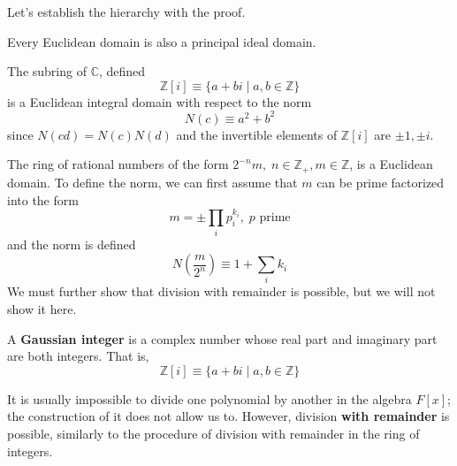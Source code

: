   Let's establish the hierarchy with the proof. 

  \begin{proposition}
    Every Euclidean domain is also a principal ideal domain. 
  \end{proposition}

  \begin{example}
    The subring of $\mathbb{C}$, defined
    \begin{equation}
      \mathbb{Z}[i] \equiv \{ a + b i \; | \; a, b \in \mathbb{Z} \}
    \end{equation}
    is a Euclidean integral domain with respect to the norm 
    \begin{equation}
      N(c) \equiv a^2 + b^2
    \end{equation}
    since $N(c d) = N(c) N(d)$ and the invertible elements of $\mathbb{Z}[i]$ are $\pm 1, \pm i$. 
  \end{example}

  \begin{example}
    The ring of rational numbers of the form $2^{-n} m, \; n \in \mathbb{Z}_+, m \in \mathbb{Z}$, is a Euclidean domain. To define the norm, we can first assume that $m$ can be prime factorized into the form 
    \begin{equation}
      m = \pm \prod_{i} p_{i}^{k_i}, \; p \text{ prime}
    \end{equation}
    and the norm is defined 
    \begin{equation}
      N(\frac{m}{2^n}) \equiv 1 + \sum_i k_i
    \end{equation}
    We must further show that division with remainder is possible, but we will not show it here. 
  \end{example}

  \begin{definition}
    A \textbf{Gaussian integer} is a complex number whose real part and imaginary part are both integers. That is, 
    \begin{equation}
      \mathbb{Z}[i] \equiv \{a + b i \;|\; a, b \in \mathbb{Z} \}
    \end{equation}
  \end{definition}

  It is usually impossible to divide one polynomial by another in the algebra $F[x]$; the construction of it does not allow us to. However, division \textbf{with remainder} is possible, similarly to the procedure of division with remainder in the ring of integers. 

